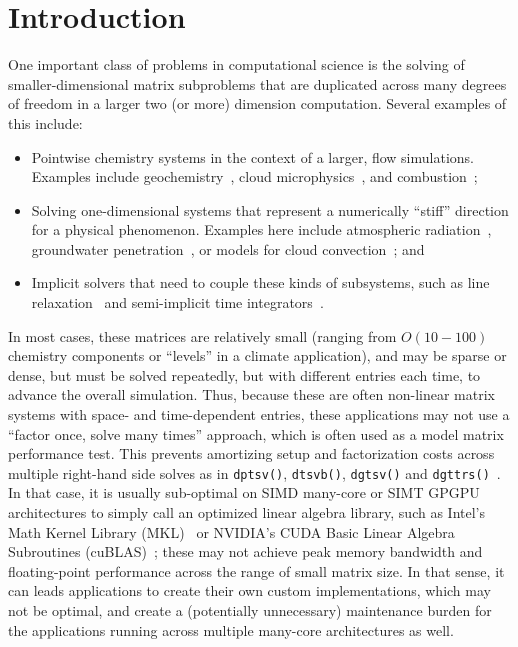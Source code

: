 \documentclass{sig-alternate-05-2015}
\begin{document}
\section{Introduction}
\label{sec:introduction}

One important class of problems in computational science is the solving
  of smaller-dimensional matrix subproblems that are duplicated across
  many degrees of freedom in a larger two (or more) dimension computation.
Several examples of this include: 
\begin{itemize}
\item Pointwise chemistry systems in the context of a larger, 
  flow simulations. 
Examples include geochemistry~\cite{PFLOTRAN_2010}, 
  cloud microphysics~\cite{MG2_2015}, and combustion~\cite{PaznerEtAl_2016};
\item Solving one-dimensional systems that represent a numerically ``stiff''
  direction for a physical phenomenon.
Examples here include atmospheric radiation~\cite{RRTMG_2008}, groundwater
  penetration~\cite{CLM_PFLO_2016}, or models for 
  cloud convection~\cite{SAM_2005}; and
\item Implicit solvers that need to couple these kinds of subsystems, 
  such as line relaxation~\cite{TrottenbergEtAl_2000} and 
  semi-implicit time integrators~\cite{WellerEtAl_2013}.
\end{itemize}
In most cases, these matrices are relatively small 
  (ranging from \(O(10-100)\) chemistry components or ``levels'' 
  in a climate application), and may be sparse or dense, but must 
  be solved repeatedly, but with different entries each time, 
  to advance the overall simulation.
Thus, because these are often non-linear matrix systems with space- and 
  time-dependent entries, these applications may not use a 
  ``factor once, solve many times'' approach, which is often used 
  as a model matrix performance test.
This prevents amortizing setup and factorization costs across multiple
  right-hand side solves as in \lstinline{dptsv()}, \lstinline{dtsvb()},
  \lstinline{dgtsv()} and \lstinline{dgttrs()}~\cite{intel_mkl_manual}.
In that case, it is usually sub-optimal on SIMD many-core or SIMT GPGPU
  architectures to simply call an optimized linear algebra library, 
  such as Intel's Math Kernel Library (MKL)~\cite{mkl_website} or NVIDIA's
  CUDA Basic Linear Algebra Subroutines (cuBLAS)~\cite{cublas_website}; these
  may not achieve peak memory bandwidth and floating-point performance across 
  the range of small matrix size. 
In that sense, it can leads applications to create their own 
  custom implementations, which may not be optimal, and create a 
  (potentially unnecessary) maintenance burden for the applications 
  running across multiple many-core architectures as well. 
  
\end{document}
